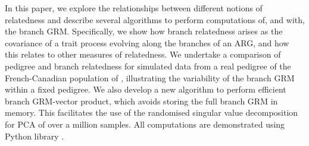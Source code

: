 %
%
%
%


In this paper, we explore the relationships between different notions of relatedness and
describe several algorithms to perform computations of, and with, the branch GRM.
%
Specifically, we show how branch relatedness arises as
the covariance of a trait process evolving along the branches of an ARG, and how this relates to other measures of relatedness.
%
We undertake a comparison of pedigree and branch relatedness
for simulated data from a real pedigree of the French-Canadian population of
\citet{andersontrocme2023genes},
illustrating the variability of the branch GRM within a fixed pedigree.
%
%
We also develop a new algorithm to perform efficient branch GRM-vector product,
which avoids storing the full branch GRM in memory.
%
This facilitates the use of the randomised singular value decomposition \citep{halko2011findingstructure}
for PCA of over a million samples.
%
All computations are demonstrated using Python \tskit{} library
\citep{ralph2020efficiently, kelleher2024tskit}.
